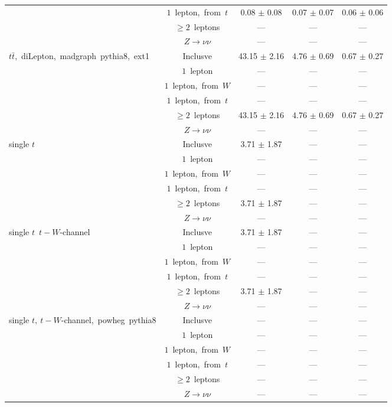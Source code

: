 \documentclass{article}
\begin{document}
\begin{longtable}{|l|c|c|c|c|}
 & $1$~lepton,~from~$t$  & 0.08 $\pm$ 0.08  & 0.07 $\pm$ 0.07  & 0.06 $\pm$ 0.06 \\* 
 & $\ge2$~leptons  & ---  & ---  & --- \\* 
 & $Z\rightarrow\nu\nu$  & ---  & ---  & --- \\* 
\hline 
\multirow{6}{*}{$t\bar{t}$,~diLepton,~madgraph~pythia8,~ext1} & Inclusve  & 43.15 $\pm$ 2.16  & 4.76 $\pm$ 0.69  & 0.67 $\pm$ 0.27 \\* 
 & $1$~lepton  & ---  & ---  & --- \\* 
 & $1$~lepton,~from~$W$  & ---  & ---  & --- \\* 
 & $1$~lepton,~from~$t$  & ---  & ---  & --- \\* 
 & $\ge2$~leptons  & 43.15 $\pm$ 2.16  & 4.76 $\pm$ 0.69  & 0.67 $\pm$ 0.27 \\* 
 & $Z\rightarrow\nu\nu$  & ---  & ---  & --- \\* 
\hline 
\multirow{6}{*}{single $t$} & Inclusve  & 3.71 $\pm$ 1.87  & ---  & --- \\* 
 & $1$~lepton  & ---  & ---  & --- \\* 
 & $1$~lepton,~from~$W$  & ---  & ---  & --- \\* 
 & $1$~lepton,~from~$t$  & ---  & ---  & --- \\* 
 & $\ge2$~leptons  & 3.71 $\pm$ 1.87  & ---  & --- \\* 
 & $Z\rightarrow\nu\nu$  & ---  & ---  & --- \\* 
\hline 
\multirow{6}{*}{single $t$~$t-W$-channel} & Inclusve  & 3.71 $\pm$ 1.87  & ---  & --- \\* 
 & $1$~lepton  & ---  & ---  & --- \\* 
 & $1$~lepton,~from~$W$  & ---  & ---  & --- \\* 
 & $1$~lepton,~from~$t$  & ---  & ---  & --- \\* 
 & $\ge2$~leptons  & 3.71 $\pm$ 1.87  & ---  & --- \\* 
 & $Z\rightarrow\nu\nu$  & ---  & ---  & --- \\* 
\hline 
\multirow{6}{*}{single $t,~t-W$-channel,~powheg~pythia8} & Inclusve  & ---  & ---  & --- \\* 
 & $1$~lepton  & ---  & ---  & --- \\* 
 & $1$~lepton,~from~$W$  & ---  & ---  & --- \\* 
 & $1$~lepton,~from~$t$  & ---  & ---  & --- \\* 
 & $\ge2$~leptons  & ---  & ---  & --- \\* 
 & $Z\rightarrow\nu\nu$  & ---  & ---  & --- \\* 

\end{longtable}
\end{document}
